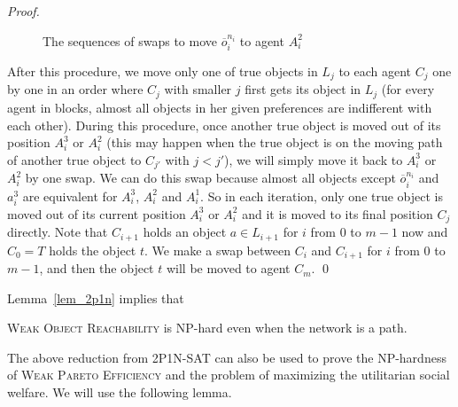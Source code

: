 \begin{proof}
\begin{figure}[htbp]
\begin{tikzpicture}
            \end{tikzpicture}
            \caption{The sequences of swaps to move $\overline{o}_i^{n_i}$ to agent $A_i^2$}\label{casev0}
    \end{figure}
    After this procedure, we move only one of true objects in $L_j$ to each agent $C_j$ one by one in an order where $C_j$ with smaller $j$ first gets its object in $L_j$ (for every agent in blocks, almost all objects in her given preferences are indifferent with each other).
    During this procedure, once another true object %
    is moved out of its position $A_i^3$ or $A_i^2$ (this may happen when the true object is on the moving path of another true object to $C_{j'}$ with $j<j'$), we will simply move it back to $A_i^3$ or $A_i^2$  by one swap. We can do this swap because almost all objects except $\overline{o}_i^{n_i}$ and $a_i^3$
    are equivalent for $A_i^3$, $A_i^2$ and $A_i^1$.
    So in each iteration, only one true object is moved out of its current position $A_i^3$ or $A_i^2$ and it is moved to its final position $C_j$ directly.
    Note that $C_{i+1}$ holds an object $a\in L_{i+1}$ for $i$ from $0$ to $m-1$ now and $C_0=T$ holds the object $t$. We make a swap between $C_i$ and $C_{i+1}$ for $i$ from $0$ to $m-1$, and then
    the object $t$ will be moved to agent $C_m$.
    \qed
\end{proof}

Lemma~\ref{lem_2p1n} implies that

\begin{theorem}
    \label{the_wor}
      \textsc{Weak Object Reachability} is NP-hard even when the network is a path.
\end{theorem}


The above reduction from \textsc{2P1N-SAT} can also be used to prove the NP-hardness of \textsc{Weak Pareto Efficiency} and the problem of maximizing the utilitarian social welfare.
We will use the following lemma.

